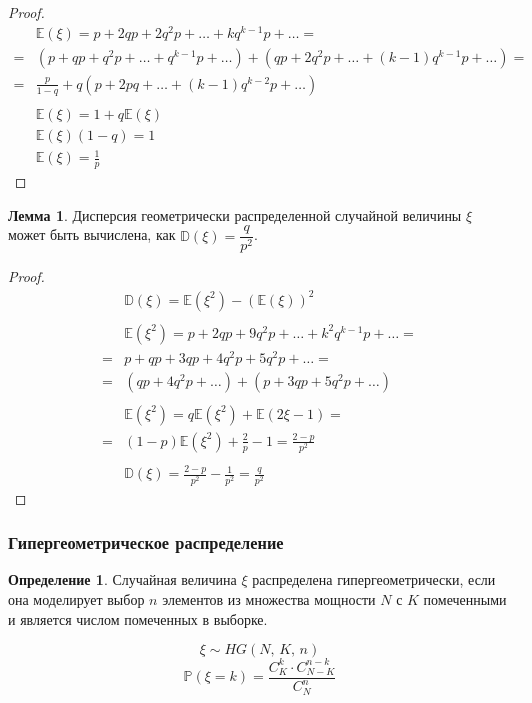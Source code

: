 \documentclass[12pt]{article}
\theoremstyle{definition}
\newtheorem{lemma}[theorem]{Лемма}
\newtheorem{definition}{Определение}
\newcommand{\E}{\mathbb{E}}
\newcommand{\D}{\mathbb{D}}
\newcommand{\prob}{\mathbb{P}}
\begin{document}
\begin{proof}
    \begin{align*}
        &\E(\xi)=p+2qp+2q^2p+\ldots+kq^{k-1}p+\ldots=\\
        =&(p+qp+q^2p+\ldots+q^{k-1}p+\ldots)+(qp+2q^2p+\ldots+(k-1)q^{k-1}p+\ldots)=\\
        =&\frac{p}{1-q}+q(p+2pq+\ldots+(k-1)q^{k-2}p+\ldots)\\\\
        &\E(\xi)=1+q\E(\xi)\\
        &\E(\xi)(1-q)=1\\
        &\E(\xi)=\frac{1}{p}
    \end{align*}
\end{proof}

\begin{lemma}
    Дисперсия геометрически распределенной случайной величины $\xi$ может быть вычислена, как $\D(\xi)=\dfrac{q}{p^2}$.
\end{lemma}

\begin{proof}
    \begin{align*}
        &\D(\xi)=\E(\xi^2)-(\E(\xi))^2\\\\
        &\E(\xi^2)=p+2qp+9q^2p+\ldots+k^2q^{k-1}p+\ldots=\\
        =&p+qp+3qp+4q^2p+5q^2p+\ldots=\\
        =&(qp+4q^2p+\ldots)+(p+3qp+5q^2p+\ldots)\\\\
        &\E(\xi^2)=q\E(\xi^2)+\E(2\xi-1)=\\
        =&(1-p)\E(\xi^2)+\frac{2}{p}-1=\frac{2-p}{p^2}\\\\
        &\D(\xi)=\frac{2-p}{p^2}-\frac{1}{p^2}=\frac{q}{p^2}
    \end{align*}
\end{proof}

\subsubsection{Гипергеометрическое распределение}
\begin{definition}
    Случайная величина $\xi$ распределена гипергеометрически, если она моделирует выбор $n$ элементов из множества мощности $N$ с $K$ помеченными и является числом помеченных в выборке.
\end{definition}
$$\xi \sim HG(N,\,K,\,n)$$
$$\prob(\xi=k)=\frac{C_K^k\cdot C_{N-K}^{n-k}}{C_N^n}$$
\end{document}
